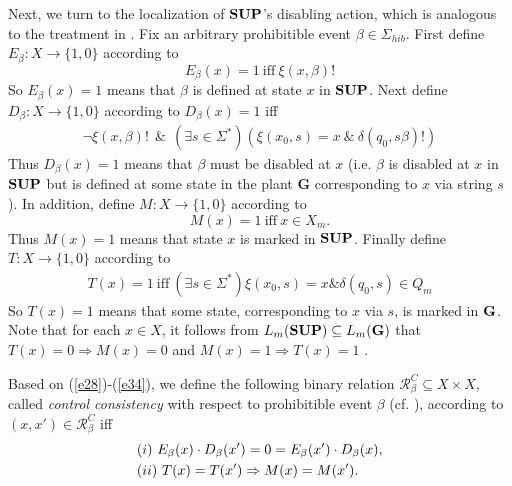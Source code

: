 \documentclass[twocolumn]{autart}
\newcommand{\rmnum}[1]{\romannumeral #1}
\begin{document}
Next, we turn to the localization of ${\bf SUP}$'s disabling action,
which is analogous to the treatment in \cite{CaiWonham:2010a}. Fix
an arbitrary prohibitible event $\beta \in \Sigma_{hib}$. First
define $E_\beta: X \rightarrow \{1,0\}$ according to
\begin{equation}\label{e28}
E_\beta(x) = 1~\text{iff}~\xi(x,\beta)!
\end{equation}
So $E_\beta(x) = 1$ means that $\beta$ is defined at state $x$ in
$\bf SUP$. Next define $D_\beta: X\rightarrow\{1,0\}$ according to
$D_\beta(x) = 1$ iff
\begin{eqnarray}\label{e29}
\neg\xi(x,\beta)! \ ~\&~\ (\exists s\in \Sigma^*)\left(\xi(x_0,s)=x
~\&~\delta(q_0, s\beta)! \right)
\end{eqnarray}
Thus $D_\beta(x) = 1$ means that $\beta$ must be disabled at $x$
(i.e. $\beta$ is disabled at $x$ in $\bf SUP$ but is defined at some
state in the plant $\textbf{G}$ corresponding to $x$ via string
$s$). In addition, define $M: X \rightarrow \{1,0\}$ according to
\begin{equation} \label{e33}
M(x) = 1~\text{iff}~ x \in X_m.
\end{equation}
Thus $M(x)=1$ means that state $x$ is marked in $\bf SUP$. Finally
define $T:X\rightarrow \{1,0\}$ according to
\begin{align} \label{e34}
T(x) = 1~\text{iff}~ (\exists s\in \Sigma^*)\xi(x_0,s) = x  \&
\delta(q_0,s) \in Q_m
\end{align}
So $T(x)=1$ means that some state, corresponding to
$x$ via $s$, is marked in $\bf G$. Note that for each $x\in X$, it
follows from $L_m({\bf SUP}) \subseteq L_m({\bf G})$ that $T(x) = 0
\Rightarrow M(x) = 0$ and $M(x) = 1 \Rightarrow T(x) = 1$
\cite{CaiWonham:2010a}.

Based on (\ref{e28})-(\ref{e34}), we define the following binary
relation $\mathcal{R}^C_{\beta} \subseteq X\times X$, called {\it
control consistency} with respect to prohibitible event $\beta$ (cf.
\cite{CaiWonham:2010a}), according to $(x,x')\in
\mathcal{R}^C_{\beta}$ iff
\begin{align} \label{e30}
&(\rmnum{1})~E_\beta(x)\cdot D_\beta(x') = 0 = E_\beta(x')\cdot D_\beta(x), \notag\\
&(\rmnum{2})~T(x) = T(x') \Rightarrow M(x) = M(x').
\end{align}
\end{document}
